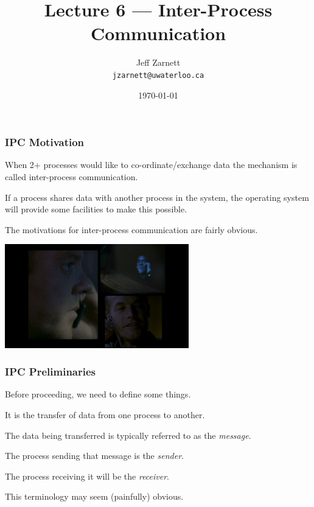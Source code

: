 

\title{Lecture 6 --- Inter-Process Communication}

\author{Jeff Zarnett \\ \small \texttt{jzarnett@uwaterloo.ca}}
\date{\today}




\begin{frame}
  \titlepage

 \end{frame}

\begin{frame}
\frametitle{IPC Motivation}

When 2+ processes would like to co-ordinate/exchange data the mechanism is called \alert{inter-process communication}.

If a process shares data with another process in the system, the operating system will provide some facilities to make this possible. 

The motivations for inter-process communication are fairly obvious.

\begin{center}
	\includegraphics[width=0.6\textwidth]{images/24-splitscreen.jpg}
\end{center}

\end{frame}


\begin{frame}
\frametitle{IPC Preliminaries}

Before proceeding, we need to define some things. 

It is the transfer of data from one process to another. 

The data being transferred is typically referred to as the \textit{message}. 

The process sending that message is the \textit{sender}.

The process receiving it will be the \textit{receiver}.

 This terminology may seem (painfully) obvious. 

\end{frame}


